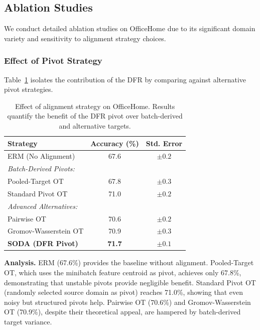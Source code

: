 \documentclass[preprint,12pt]{elsarticle}
\begin{document}
\subsection{Ablation Studies}
\label{ssec:ablation}

We conduct detailed ablation studies on OfficeHome due to its significant domain variety and sensitivity to alignment strategy choices.

\subsubsection{Effect of Pivot Strategy}

Table~\ref{tab:ablation_pivot} isolates the contribution of the DFR by comparing against alternative pivot strategies.

\begin{table}[t]
\caption{Effect of alignment strategy on OfficeHome. Results quantify the benefit of the DFR pivot over batch-derived and alternative targets.}
\label{tab:ablation_pivot}
\centering
\small
\renewcommand{\arraystretch}{1.1}
\begin{tabular}{lcc}
\toprule
\textbf{Strategy} & \textbf{Accuracy (\%)} & \textbf{Std. Error} \\
\midrule
ERM (No Alignment) & 67.6 & $\pm 0.2$ \\
\midrule
\multicolumn{3}{l}{\textit{Batch-Derived Pivots:}} \\
\quad Pooled-Target OT & 67.8 & $\pm 0.3$ \\
\quad Standard Pivot OT & 71.0 & $\pm 0.2$ \\
\midrule
\multicolumn{3}{l}{\textit{Advanced Alternatives:}} \\
\quad Pairwise OT & 70.6 & $\pm 0.2$ \\
\quad Gromov-Wasserstein OT & 70.9 & $\pm 0.3$ \\
\midrule
\textbf{SODA (DFR Pivot)} & \textbf{71.7} & $\pm 0.1$ \\
\bottomrule
\end{tabular}
\end{table}

\textbf{Analysis.} ERM (67.6\%) provides the baseline without alignment. Pooled-Target OT, which uses the minibatch feature centroid as pivot, achieves only 67.8\%, demonstrating that unstable pivots provide negligible benefit. Standard Pivot OT (randomly selected source domain as pivot) reaches 71.0\%, showing that even noisy but structured pivots help. Pairwise OT (70.6\%) and Gromov-Wasserstein OT (70.9\%), despite their theoretical appeal, are hampered by batch-derived target variance.
\end{document}
